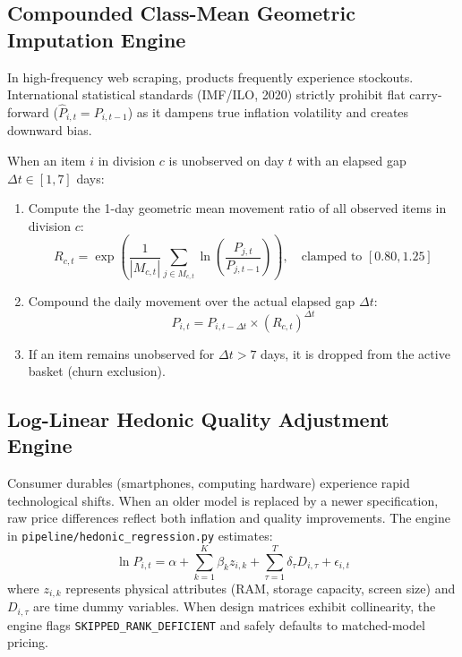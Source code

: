 \documentclass[11pt,a4paper]{article}
\begin{document}
\subsection{Compounded Class-Mean Geometric Imputation Engine}
In high-frequency web scraping, products frequently experience stockouts. International statistical standards (IMF/ILO, 2020) strictly prohibit flat carry-forward ($\widehat{P}_{i, t} = P_{i, t-1}$) as it dampens true inflation volatility and creates downward bias.

When an item $i$ in division $c$ is unobserved on day $t$ with an elapsed gap $\Delta t \in [1, 7]$ days:
\begin{enumerate}
    \item Compute the 1-day geometric mean movement ratio of all observed items in division $c$:
    \begin{equation}
    R_{c, t} = \exp \left( \frac{1}{|M_{c, t}|} \sum_{j \in M_{c, t}} \ln \left( \frac{P_{j, t}}{P_{j, t-1}} \right) \right), \quad \text{clamped to } [0.80, 1.25]
    \end{equation}
    \item Compound the daily movement over the actual elapsed gap $\Delta t$:
    \begin{equation}
    \widehat{P}_{i, t} = P_{i, t - \Delta t} \times \left( R_{c, t} \right)^{\Delta t}
    \end{equation}
    \item If an item remains unobserved for $\Delta t > 7$ days, it is dropped from the active basket (churn exclusion).
\end{enumerate}

\subsection{Log-Linear Hedonic Quality Adjustment Engine}
Consumer durables (smartphones, computing hardware) experience rapid technological shifts. When an older model is replaced by a newer specification, raw price differences reflect both inflation and quality improvements. The engine in \texttt{pipeline/hedonic\_regression.py} estimates:
\begin{equation}
\ln P_{i, t} = \alpha + \sum_{k=1}^K \beta_k z_{i, k} + \sum_{\tau=1}^T \delta_\tau D_{i, \tau} + \epsilon_{i, t}
\end{equation}
where $z_{i,k}$ represents physical attributes (RAM, storage capacity, screen size) and $D_{i,\tau}$ are time dummy variables. When design matrices exhibit collinearity, the engine flags \texttt{SKIPPED\_RANK\_DEFICIENT} and safely defaults to matched-model pricing.
\end{document}
